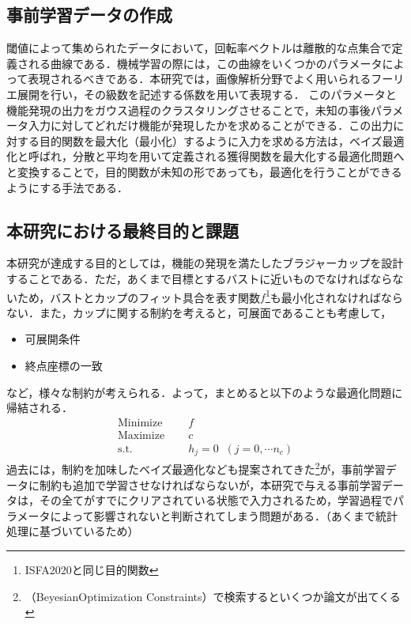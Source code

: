 \documentclass[11pt]{jsarticle}
\begin{document}
		\subsection{事前学習データの作成}
			閾値によって集められたデータにおいて，回転率ベクトルは離散的な点集合で定義される曲線である．機械学習の際には，この曲線をいくつかのパラメータによって表現されるべきである．本研究では，画像解析分野でよく用いられるフーリエ展開を行い，その級数を記述する係数を用いて表現する．
			このパラメータと機能発現の出力をガウス過程のクラスタリングさせることで，未知の事後パラメータ入力に対してどれだけ機能が発現したかを求めることができる．この出力に対する目的関数を最大化（最小化）するように入力を求める方法は，ベイズ最適化と呼ばれ，分散と平均を用いて定義される獲得関数を最大化する最適化問題へと変換することで，目的関数が未知の形であっても，最適化を行うことができるようにする手法である．
		\subsection{本研究における最終目的と課題}
			本研究が達成する目的としては，機能の発現を満たしたブラジャーカップを設計することである．ただ，あくまで目標とするバストに近いものでなければならないため，バストとカップのフィット具合を表す関数$ f $\footnote{ISFA2020と同じ目的関数}も最小化されなければならない．また，カップに関する制約を考えると，可展面であることも考慮して，
			\begin{itemize}
				\item 可展開条件
				\item 終点座標の一致
			\end{itemize}
			など，様々な制約が考えられる．よって，まとめると以下のような最適化問題に帰結される．
			\begin{eqnarray}
				\mathrm{Minimize} &&\;\;f \\
				\mathrm{Maximize} &&\;\;c \\
				\mathrm{s.t.} &&\;\;h_j=0\;\;(j=0,\cdots n_c)
			\end{eqnarray}
			過去には，制約を加味したベイズ最適化なども提案されてきた\footnote{（BeyesianOptimization Constraints）で検索するといくつか論文が出てくる}が，事前学習データに制約も追加で学習させなければならないが，本研究で与える事前学習データは，その全てがすでにクリアされている状態で入力されるため，学習過程でパラメータによって影響されないと判断されてしまう問題がある．（あくまで統計処理に基づいているため）
\end{document}
